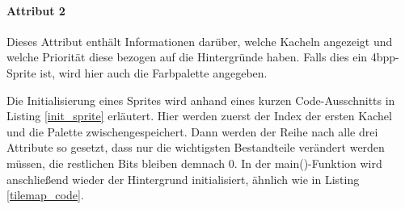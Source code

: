 \paragraph{Attribut 2} 
Dieses Attribut enthält Informationen darüber, welche Kacheln angezeigt und welche Priorität diese bezogen auf die Hintergründe haben. Falls dies ein 4bpp-Sprite ist, wird hier auch die Farbpalette angegeben. \citep{sprites}

Die Initialisierung eines Sprites wird anhand eines kurzen Code-Ausschnitts in Listing \ref{init_sprite} erläutert. Hier werden zuerst der Index der ersten Kachel und die Palette zwischengespeichert. Dann werden der Reihe nach alle drei Attribute so gesetzt, dass nur die wichtigsten Bestandteile verändert werden müssen, die restlichen Bits bleiben demnach 0. In der main()-Funktion wird anschließend wieder der Hintergrund initialisiert, ähnlich wie in Listing \ref{tilemap_code}.



